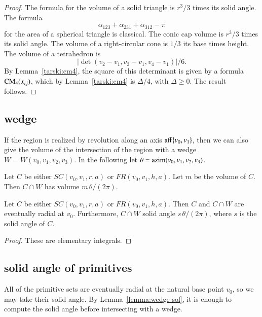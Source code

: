 \begin{proof}
The formula for the volume of a solid triangle is $r^3/3$ times
its solid angle.  The formula 
   $$\alpha_{123}+\alpha_{231}+\alpha_{312}-\pi$$
for the area of a spherical triangle is classical.    
The conic cap volume is
$r^3/3$ times its solid angle.  
The volume of a right-circular cone is $1/3$ its base times height.
The volume of a tetrahedron is
   $$|\det(v_2-v_1,v_3-v_1,v_4-v_1)|/6.$$
By Lemma~\ref{tarski:cm4}, 
the square of this determinant is given by a formula
${\operatorname{CM}}_4(x_{ij})$, which by Lemma~\ref{tarski:cm4} is
$\Delta/4$, with $\Delta\ge0$.  The result follows.
\end{proof}



\subsection{wedge}\label{sec:wedge}

If the region is realized by revolution along an axis ${\operatorname{aff}}\{v_0,v_1\}$, 
then
we can also give the volume of the intersection of the region
with a wedge $W=W(v_0,v_1,v_2,v_3)$.
  In the following
let $\theta = {\operatorname{azim}}(v_0,v_1,v_2,v_3)$.

\begin{lemma}  Let $C$ be either $SC(v_0,v_1,r,a)$ or
   $FR(v_0,v_1,h,a)$.  Let $m$ be the volume of $C$.  
   Then $C\cap W$ has volume $m\,\theta/(2\pi)$.   
\end{lemma}

\begin{lemma}  Let $C$ be either $SC(v_0,v_1,r,a)$ or
   $FR(v_0,v_1,h,a)$.  Then $C$ and $C\cap W$ are eventually 
radial at $v_0$. Furthermore,
    $C\cap W$ solid angle 
  $s\,\theta/(2\pi)$, where $s$ is the solid angle of $C$.
\end{lemma}


\begin{proof}
These are elementary integrals.
\end{proof}


\subsection{solid angle of primitives}

All of the primitive sets are eventually radial at the natural
base point $v_0$, so we may take their
solid angle.  By Lemma~\ref{lemma:wedge-sol}, it is enough to compute
the solid angle before intersecting with a wedge.

